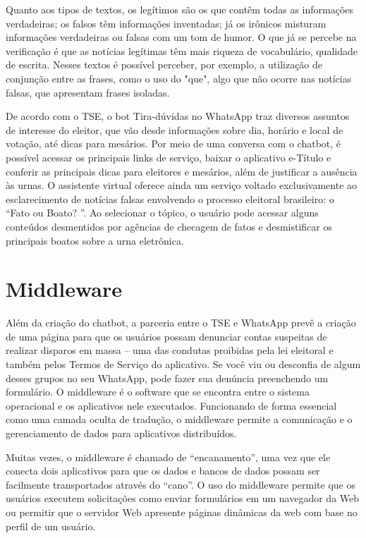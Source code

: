 Quanto aos tipos de textos, os legítimos são os que contêm todas as informações verdadeiras; os falsos têm informações inventadas; já os irônicos misturam informações verdadeiras ou falsas com um tom de humor. O que já se percebe na verificação é que as notícias legítimas têm mais riqueza de vocabulário, qualidade de escrita. Nesses textos é possível perceber, por exemplo, a utilização de conjunção entre as frases, como o uso do "que", algo que não ocorre nas notícias falsas, que apresentam frases isoladas.

De acordo com o TSE, o bot Tira-dúvidas no WhatsApp traz diversos assuntos de interesse do eleitor, que vão desde informações sobre dia, horário e local de votação, até dicas para mesários. Por meio de uma conversa com o chatbot, é possível acessar os principais links de serviço, baixar o aplicativo e-Título e conferir as principais dicas para eleitores e mesários, além de justificar a ausência às urnas.
O assistente virtual oferece ainda um serviço voltado exclusivamente ao esclarecimento de notícias falsas envolvendo o processo eleitoral brasileiro: o “Fato ou Boato? ”. Ao selecionar o tópico, o usuário pode acessar alguns conteúdos desmentidos por agências de checagem de fatos e desmistificar os principais boatos sobre a urna eletrônica.

\section{Middleware} %
\label{sec:middleware}

Além da criação do chatbot, a parceria entre o TSE e WhatsApp prevê a criação de uma página para que os usuários possam denunciar contas suspeitas de realizar disparos em massa – uma das condutas proibidas pela lei eleitoral e também pelos Termos de Serviço do aplicativo. Se você viu ou desconfia de algum desses grupos no seu WhatsApp, pode fazer sua denúncia preenchendo um formulário. O middleware é o software que se encontra entre o sistema operacional e os aplicativos nele executados. Funcionando de forma essencial como uma camada oculta de tradução, o middleware permite a comunicação e o gerenciamento de dados para aplicativos distribuídos.

Muitas vezes, o middleware é chamado de “encanamento”, uma vez que ele conecta dois aplicativos para que os dados e bancos de dados possam ser facilmente transportados através do “cano”. O uso do middleware permite que os usuários executem solicitações como enviar formulários em um navegador da Web ou permitir que o servidor Web apresente páginas dinâmicas da web com base no perfil de um usuário.

